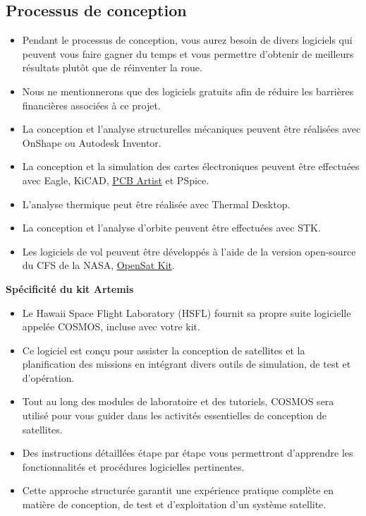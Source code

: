 \subsection{Processus de conception}
\begin{itemize}
    \item Pendant le processus de conception, vous aurez besoin de divers logiciels qui peuvent vous faire gagner du temps et vous permettre d'obtenir de meilleurs résultats plutôt que de réinventer la roue.  
    \item Nous ne mentionnerons que des logiciels gratuits afin de réduire les barrières financières associées à ce projet.  
    \item La conception et l’analyse structurelles mécaniques peuvent être réalisées avec OnShape ou Autodesk Inventor.  
    \item La conception et la simulation des cartes électroniques peuvent être effectuées avec Eagle, KiCAD, \href{http://4pcb.com/}{PCB Artist} et PSpice.  
    \item L'analyse thermique peut être réalisée avec Thermal Desktop.  
    \item La conception et l’analyse d’orbite peuvent être effectuées avec STK.  
    \item Les logiciels de vol peuvent être développés à l’aide de la version open-source du CFS de la NASA, \href{https://github.com/OpenSatKit/OpenSatKit}{OpenSat Kit}.  
\end{itemize}

\textbf{Spécificité du kit Artemis}
\begin{itemize}
    \item Le Hawaii Space Flight Laboratory (HSFL) fournit sa propre suite logicielle appelée COSMOS, incluse avec votre kit.  
    \item Ce logiciel est conçu pour assister la conception de satellites et la planification des missions en intégrant divers outils de simulation, de test et d’opération.  
    \item Tout au long des modules de laboratoire et des tutoriels, COSMOS sera utilisé pour vous guider dans les activités essentielles de conception de satellites.  
    \item Des instructions détaillées étape par étape vous permettront d’apprendre les fonctionnalités et procédures logicielles pertinentes.  
    \item Cette approche structurée garantit une expérience pratique complète en matière de conception, de test et d’exploitation d’un système satellite.  
\end{itemize}
